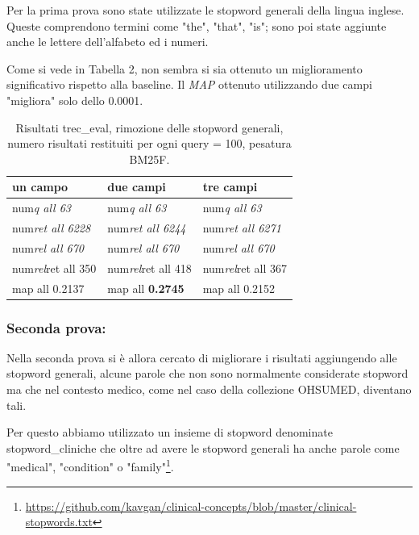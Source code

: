 \documentclass[runningheads]{llncs}
\begin{document}
Per la prima prova sono state utilizzate le stopword generali della lingua inglese. Queste comprendono termini come "the", "that", "is"; sono poi state aggiunte anche le lettere dell'alfabeto ed i numeri.

Come si vede in Tabella 2, non sembra si sia ottenuto un miglioramento significativo rispetto alla baseline. Il \textit{MAP} ottenuto utilizzando due campi "migliora" solo dello 0.0001.
\begin{table}
\vspace{-3mm}
\centering
\begin{tabular}{lll}
\hline
\textbf{ un campo }           & \textbf{ due campi }           & \textbf{ tre campi }            \\ \hline
 num\textit{q all 63 }       &  num\textit{q all 63 }       &  num\textit{q all 63 }        \\
 num\textit{ret all 6228 }  &  num\textit{ret all 6244 }  &  num\textit{ret all 6271 }   \\
 num\textit{rel all 670 }    &  num\textit{rel all 670 }    &  num\textit{rel all 670 }     \\
 num\textit{rel}ret all 350  &  num\textit{rel}ret all 418  &  num\textit{rel}ret all 367   \\
map all 0.2137               & map all \bf 0.2745               & map all 0.2152          \\ \hline
\end{tabular}

\caption{ Risultati trec\_eval, rimozione delle stopword generali, numero risultati restituiti per ogni query = 100, pesatura BM25F.}
\vspace{-7mm}
\end{table}

\subsubsection{Seconda prova:}

Nella seconda prova si \`e allora cercato di migliorare i risultati aggiungendo alle stopword generali, alcune parole che non sono normalmente considerate stopword ma che nel contesto medico, come nel caso della collezione OHSUMED, diventano tali.

Per questo abbiamo utilizzato un insieme di stopword denominate stopword\_cliniche che oltre ad avere le stopword generali ha anche parole come "medical", "condition" o "family"\footnote{ \url{https://github.com/kavgan/clinical-concepts/blob/master/clinical-stopwords.txt}}.
\end{document}
